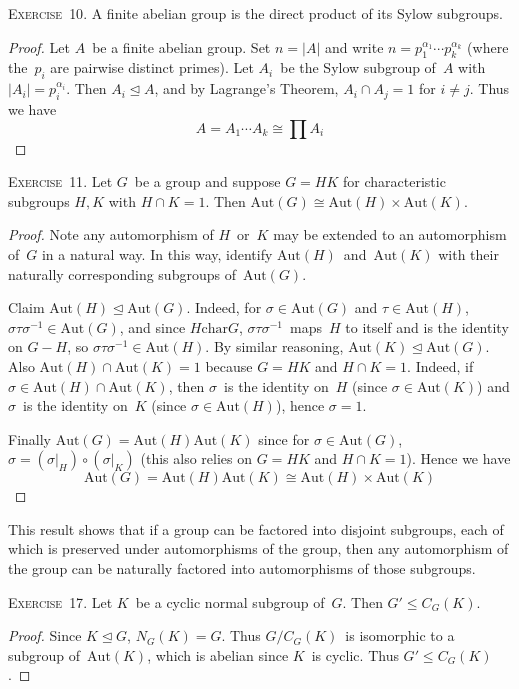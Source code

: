 \documentclass[letterpaper]{article}
\newcommand{\exercise}[1]{\goodbreak\noindent\textsc{Exercise~{#1}.}}
\newcommand{\iso}{\cong}
\newcommand{\sect}{\cap}
\newcommand{\subgroup}{\le}
\newcommand{\normal}{\trianglelefteq}
\newcommand{\aut}{\mathrm{Aut}}
\newcommand{\chr}{\mathrel{\mathrm{char}}}
\newcommand{\ord}[1]{|{#1}|}
\begin{document}
\exercise{10}
A finite abelian group is the direct product of its Sylow subgroups.
\begin{proof}
Let $A$~be a finite abelian group. Set $n=\ord{A}$ and write $n=p_1^{\alpha_1}\cdots p_k^{\alpha_k}$ (where the~$p_i$ are pairwise distinct primes). Let $A_i$~be the Sylow subgroup of~$A$ with $\ord{A_i}=p_i^{\alpha_i}$. Then $A_i\normal A$, and by Lagrange's Theorem, $A_i\sect A_j=1$ for $i\ne j$. Thus we have
$$A=A_1\cdots A_k\iso\prod A_i$$
\end{proof}

\exercise{11}
Let $G$~be a group and suppose $G=HK$ for characteristic subgroups $H,K$ with $H\sect K=1$. Then $\aut(G)\iso\aut(H)\times\aut(K)$.
\begin{proof}
Note any automorphism of $H$~or~$K$ may be extended to an automorphism of~$G$ in a natural way. In this way, identify $\aut(H)$~and~$\aut(K)$ with their naturally corresponding subgroups of~$\aut(G)$.

Claim $\aut(H)\normal\aut(G)$. Indeed, for $\sigma\in\aut(G)$ and $\tau\in\aut(H)$, $\sigma\tau\sigma^{-1}\in\aut(G)$, and since $H\chr G$, $\sigma\tau\sigma^{-1}$~maps~$H$ to itself and is the identity on $G-H$, so $\sigma\tau\sigma^{-1}\in\aut(H)$. By similar reasoning, $\aut(K)\normal\aut(G)$. Also $\aut(H)\sect\aut(K)=1$ because $G=HK$ and $H\sect K=1$. Indeed, if $\sigma\in\aut(H)\sect\aut(K)$, then $\sigma$~is the identity on~$H$ (since $\sigma\in\aut(K)$) and $\sigma$~is the identity on~$K$ (since $\sigma\in\aut(H)$), hence $\sigma=1$.

Finally $\aut(G)=\aut(H)\aut(K)$ since for $\sigma\in\aut(G)$, $\sigma=(\sigma|_H)\circ(\sigma|_K)$ (this also relies on $G=HK$ and $H\sect K=1$). Hence we have
$$\aut(G)=\aut(H)\aut(K)\iso\aut(H)\times\aut(K)$$
\end{proof}
\noindent This result shows that if a group can be factored into disjoint subgroups, each of which is preserved under automorphisms of the group, then any automorphism of the group can be naturally factored into automorphisms of those subgroups.

\bigskip
\exercise{17}
Let $K$~be a cyclic normal subgroup of~$G$. Then $G'\subgroup C_G(K)$.
\begin{proof}
Since $K\normal G$, $N_G(K)=G$. Thus $G/C_G(K)$~is isomorphic to a subgroup of~$\aut(K)$, which is abelian since $K$~is cyclic. Thus $G'\subgroup C_G(K)$.
\end{proof}
\end{document}

